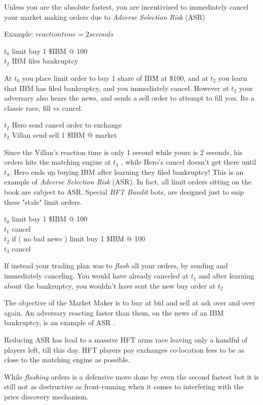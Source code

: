 \documentclass[12pt]{article}
\begin{document}
Unless you are the absolute fastest, you are incentivized to immediately cancel your market making orders due to \emph{Adverse Selection Risk } (ASR)  

Example: \( reaction time = 2 seconds \) 

$t_0$ limit buy 1 \$IBM @ 100 \\
$t_2$ IBM files bankruptcy 

At $t_0$ you place limit order to buy 1 share of IBM at \$100, and at $t_2$ you learn that IBM has filed bankruptcy, and you immediately cancel. However at $t_2$ your adversary also hears the news, and sends a sell order to attempt to fill you. Its a classic race, fill vs cancel.

$t_2$ Hero send cancel order to exchange  \\
$t_2$ Villan send sell 1 \$IBM @ market  

Since the Villan's reaction time is only 1 second while yours is 2 seconds, his orders hits the matching engine at $t_3$ , while Hero's cancel doesn't get there until $t_4$. Hero ends up buying IBM after learning they filed bankruptcy! This is an example of \emph{Adverse Selection Risk} (ASR). In fact, all limit orders sitting on the book are subject to ASR. Special \emph{HFT Bandit} bots, are designed just to snip these "stale" limit orders. 

$t_0$ limit buy 1 \$IBM @ 100 \\
$t_1$ cancel \\
$t_2$ if ( no bad news ) limit buy 1 \$IBM @ 100 \\
$t_3$ cancel 

If instead your trading plan was to \emph{flash} all your orders, by sending and immediately canceling. You would have already canceled at $t_1$ and after learning about the bankruptcy, you wouldn't have sent the new buy order at $t_2$

The objective of the Market Maker is to buy at bid and sell at ask over and over again. An adversary reacting faster than them, on the news of an IBM bankruptcy, is an example of ASR . 

Reducing ASR has lead to a massive HFT arms race \cite{notsure} leaving only a handful of players left, till this day. HFT players pay exchanges co-location fees to be as close to the matching engine as possible. 

While \emph{flashing} orders is a defensive move done by even the second fastest bot it is still not as destructive as front-running when it comes to interfering with the price discovery mechanism. 
\end{document}
